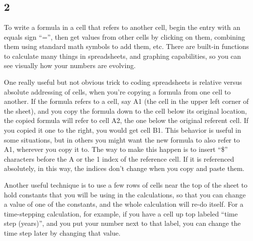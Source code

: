 
\chapter{}



\section{}\index{}





\section{2}\index{}

To write a formula in a cell that refers to another cell, begin the entry with an equals sign “=”, then get values from other cells by clicking on them, combining them using standard math symbols to add them, etc. There are built-in functions to calculate many things in spreadsheets, and graphing capabilities, so you can see visually how your numbers are evolving.

One really useful but not obvious trick to coding spreadsheets is relative versus absolute addressing of cells, when you’re copying a formula from one cell to another. If the formula refers to a cell, say A1 (the cell in the upper left corner of the sheet), and you copy the formula down to the cell below its original location, the copied formula will refer to cell A2, the one below the original referent cell. If you copied it one to the right, you would get cell B1. This behavior is useful in some situations, but in others you might want the new formula to also refer to A1, wherever you copy it to. The way to make this happen is to insert “\$” characters before the A or the 1 index of the reference cell. If it is referenced absolutely, in this way, the indices don’t change when you copy and paste them.

Another useful technique is to use a few rows of cells near the top of the sheet to hold constants that you will be using in the calculations, so that you can change a value of one of the constants, and the whole calculation will re-do itself. For a time-stepping calculation, for example, if you have a cell up top labeled “time step (years)”, and you put your number next to that label, you can change the time step later by changing that value.

